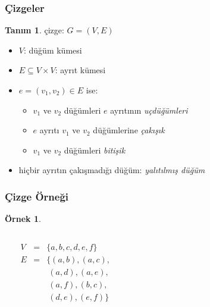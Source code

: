 \documentclass[dvipsnames]{beamer}
\theoremstyle{definition}
\newtheorem{tanim}[theorem]{Tanım}
\theoremstyle{example}
\newtheorem{ornek}[theorem]{Örnek}
\theoremstyle{plain}
\begin{document}
\begin{frame}
  \frametitle{Çizgeler}

  \begin{tanim}
    \alert{çizge}: $G=(V,E)$

    \begin{itemize}
      \item $V$: \alert{düğüm} kümesi
      \item $E \subseteq V \times V$: \alert{ayrıt} kümesi
    \end{itemize}
  \end{tanim}

  \pause
  \begin{itemize}
    \item $e=(v_1,v_2) \in E$ ise:
    \begin{itemize}
      \item $v_1$ ve $v_2$ düğümleri $e$ ayrıtının \emph{uçdüğümleri}
      \item $e$ ayrıtı $v_1$ ve $v_2$ düğümlerine \emph{çakışık}
      \item $v_1$ ve $v_2$ düğümleri \emph{bitişik}
    \end{itemize}

    \item hiçbir ayrıtın çakışmadığı düğüm: \emph{yalıtılmış düğüm}
  \end{itemize}
\end{frame}

\begin{frame}
  \frametitle{Çizge Örneği}

  \begin{ornek}
    \begin{columns}
      \begin{center}
      \end{center}

      $\begin{array}{lcl}
        V & = & \{a,b,c,d,e,f\}\\
        E & = & \{(a,b),(a,c),\\
          &   & ~(a,d),(a,e),\\
          &   & ~(a,f),(b,c),\\
          &   & ~(d,e),(e,f)\}
      \end{array}$
    \end{columns}
  \end{ornek}
\end{frame}
\end{document}
